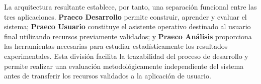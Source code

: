 La arquitectura resultante establece, por tanto, una separación funcional entre las tres aplicaciones. \textbf{Praeco Desarrollo} permite construir, aprender y evaluar el sistema; \textbf{Praeco Usuario} constituye el asistente operativo destinado al usuario final utilizando recursos previamente validados; y \textbf{Praeco Análisis} proporciona las herramientas necesarias para estudiar estadísticamente los resultados experimentales. Esta división facilita la trazabilidad del proceso de desarrollo y permite realizar una evaluación metodológicamente independiente del sistema antes de transferir los recursos validados a la aplicación de usuario.